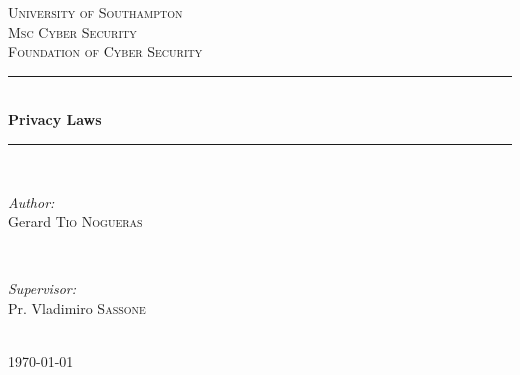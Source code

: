 \documentclass[12pt]{article} %
\begin{document}

\begin{titlepage}

\newcommand{\HRule}{\rule{\linewidth}{0.5mm}} %

\center %

\textsc{\LARGE University of Southampton}\\[1.5cm] %
\textsc{\Large Msc Cyber Security}\\[0.5cm] %
\textsc{\large Foundation of Cyber Security}\\[0.5cm] %

\HRule \\[0.4cm]
{ \huge \bfseries Privacy Laws}\\[0.4cm] %
\HRule \\[1.5cm]

\begin{minipage}{0.4\textwidth}
\begin{flushleft} \large
\emph{Author:}\\
Gerard \textsc{Tio Nogueras} %
\end{flushleft}
\end{minipage}
~
\begin{minipage}{0.4\textwidth}
\begin{flushright} \large
\emph{Supervisor:} \\
Pr. Vladimiro \textsc{Sassone} %
\end{flushright}
\end{minipage}\\[4cm]

{\large \today}\\[3cm] %


\vfill %

\end{titlepage}
\end{document}
